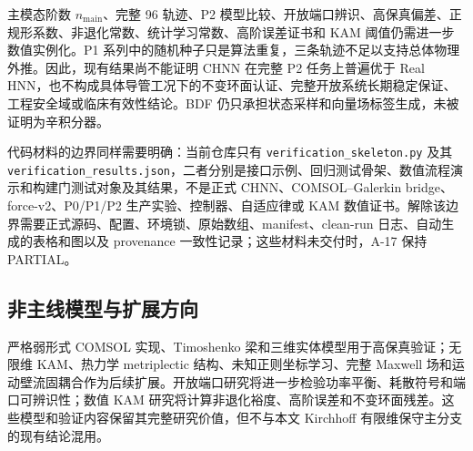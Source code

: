 主模态阶数 \(n_{\mathrm{main}}\)、完整 96 轨迹、P2 模型比较、开放端口辨识、高保真偏差、正规形系数、非退化常数、统计学习常数、高阶误差证书和 KAM 阈值仍需进一步数值实例化。P1 系列中的随机种子只是算法重复，三条轨迹不足以支持总体物理外推。因此，现有结果尚不能证明 CHNN 在完整 P2 任务上普遍优于 Real HNN，也不构成具体导管工况下的不变环面认证、完整开放系统长期稳定保证、工程安全域或临床有效性结论。BDF 仍只承担状态采样和向量场标签生成，未被证明为辛积分器。

代码材料的边界同样需要明确：当前仓库只有 \texttt{verification\_skeleton.py} 及其 \texttt{verification\_results.json}，二者分别是接口示例、回归测试骨架、数值流程演示和构建门测试对象及其结果，不是正式 CHNN、COMSOL--Galerkin bridge、force-v2、P0/P1/P2 生产实验、控制器、自适应律或 KAM 数值证书。解除该边界需要正式源码、配置、环境锁、原始数组、manifest、clean-run 日志、自动生成的表格和图以及 provenance 一致性记录；这些材料未交付时，A-17 保持 PARTIAL。

\subsection{非主线模型与扩展方向}\label{sec:discussion-7-3}

严格弱形式 COMSOL 实现、Timoshenko 梁和三维实体模型用于高保真验证；无限维 KAM、热力学 metriplectic 结构、未知正则坐标学习、完整 Maxwell 场和运动壁流固耦合作为后续扩展。开放端口研究将进一步检验功率平衡、耗散符号和端口可辨识性；数值 KAM 研究将计算非退化裕度、高阶误差和不变环面残差。这些模型和验证内容保留其完整研究价值，但不与本文 Kirchhoff 有限维保守主分支的现有结论混用。\cite{COMSOLBeamInterface2025,COMSOLGeometricNonlinearity2025,COMSOLSectionStiffness2025,COMSOLWeakFormPDE2025,COMSOLWeakContribution2025,Jackson1998Electrodynamics,Abbott2020MagneticRobotics,Coquinot2020Metriplectic,Kuksin1993InfiniteDimensionalKAM}
